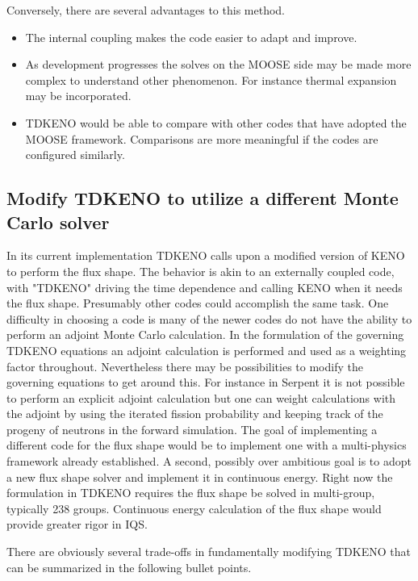 \documentclass[11pt]{article}
\begin{document}
Conversely, there are several advantages to this method.
\begin{itemize}
    \item The internal coupling makes the code easier to adapt and improve. 
    \item As development progresses the solves on the MOOSE side may be made more complex to understand other phenomenon. For instance thermal expansion may be incorporated.  
    \item TDKENO would be able to compare with other codes that have adopted the MOOSE framework.  Comparisons are more meaningful if the codes are configured similarly. 
\end{itemize}

\subsection{Modify TDKENO to utilize a different Monte Carlo solver}
	In its current implementation TDKENO  calls upon a modified version of KENO to perform the flux shape.  The behavior is akin to an externally coupled code, with "TDKENO" driving the time dependence and calling KENO when it needs the flux shape. Presumably other codes could accomplish the same task.  One difficulty in choosing a code is many of the newer codes do not have the ability to perform an adjoint Monte Carlo calculation. In the  formulation of the governing TDKENO equations an adjoint calculation is performed and used as a weighting factor throughout.  Nevertheless there may be possibilities to modify the governing equations to get around this. For instance in Serpent it is not possible to perform an explicit adjoint calculation but one can weight calculations with the adjoint by using the iterated fission probability and keeping track of the progeny of neutrons in the forward simulation.  The goal of implementing a different code for the flux shape would be to implement one with a multi-physics framework already established.  A second, possibly over ambitious goal is to adopt a new flux shape solver and implement it in continuous energy.  Right now the formulation in TDKENO requires the flux shape be solved in multi-group, typically 238 groups.  Continuous energy calculation of the flux shape would provide greater rigor in IQS.  
	
	There are obviously several trade-offs in fundamentally modifying TDKENO that can be summarized in the following bullet points.
	
\end{document}
